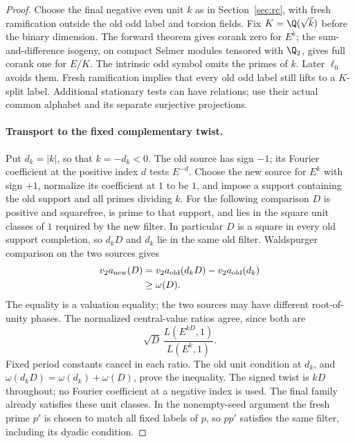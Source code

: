\begin{proof}\leavevmode
Choose the final negative even unit $k$ as in
Section~\ref{sec:rc}, with fresh ramification outside the old odd
label and torsion fields. Fix $K=\Q(\sqrt k)$ before the binary
dimension. The forward theorem gives corank zero for $E^k$;
the sum-and-difference isogeny, on compact Selmer modules tensored
with $\Q_2$, gives full corank one for $E/K$.
The intrinsic odd symbol omits the primes of $k$.
Later $\ell_0$ avoids them. Fresh ramification implies that every
old odd label still lifts to a $K$-split label.
Additional stationary tests can have relations; use their actual
common alphabet and its separate surjective projections.

\paragraph{Transport to the fixed complementary twist.}
Put $d_k=|k|$, so that $k=-d_k<0$. The old source has sign $-1$;
its Fourier coefficient at the positive index $d$ tests $E^{-d}$.
Choose the new source for $E^k$ with sign $+1$, normalize its
coefficient at $1$ to be $1$, and impose a support containing the
old support and all primes dividing $k$. For the following comparison
$D$ is positive and squarefree, is prime to that support, and lies
in the square unit classes of $1$ required by the new filter.
In particular $D$ is a square in every old support completion, so
$d_kD$ and $d_k$ lie in the same old filter. Waldspurger comparison
on the two sources gives
\[
 \begin{split}
  v_2 a_{\rm new}(D)
    &=v_2 a_{\rm old}(d_kD)-v_2 a_{\rm old}(d_k)\\
    &\ge \omega(D).
 \end{split}
\]
The equality is a valuation equality; the two sources may have
different root-of-unity phases. The normalized central-value ratios
agree, since both are
\[
 \sqrt D\,\frac{L(E^{kD},1)}{L(E^k,1)}.
\]
Fixed period constants cancel in each ratio. The old unit condition
at $d_k$, and $\omega(d_kD)=\omega(d_k)+\omega(D)$, prove the
inequality. The signed twist is $kD$ throughout; no Fourier
coefficient at a negative index is used. The final family already
satisfies these unit classes. In the nonempty-seed argument the
fresh prime $p'$ is chosen to match all fixed labels of $p$, so
$pp'$ satisfies the same filter, including its dyadic condition.


\end{proof}

